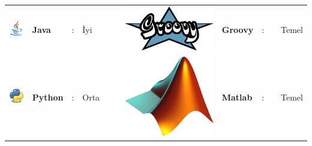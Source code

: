 \documentclass[paper=a4,fontsize=11pt]{temp} %
\begin{document}
\begin{minipage}[t]{0.66\textwidth}
\begin{tabular}{lllllllllll}
\includegraphics[scale=0.05]{IMG/languages/java} & \textbf{Java}     & : & İyi   &  &  & \includegraphics[scale=0.04]{IMG/languages/groovy} & \textbf{Groovy}     & : &  & Temel \\
\includegraphics[scale=0.05]{IMG/languages/python} & \textbf{Python}   & : & Orta  &  &  & \includegraphics[scale=0.015]{IMG/languages/matlab} & \textbf{Matlab}     & : &  & Temel
\end{tabular}

\end{minipage} \\\\\\
\end{document}
